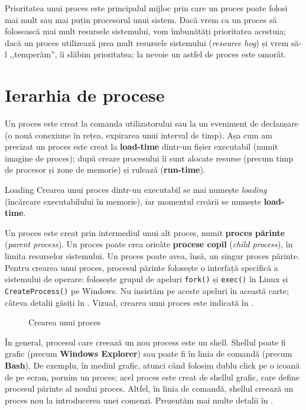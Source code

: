 Prioritatea unui proces este principalul mijloc prin care un proces poate folosi
mai mult sau mai puțin procesorul unui sistem. Dacă vrem ca un proces să
folosească mai mult resursele sistemului, vom îmbunătăți prioritatea acestuia;
dacă un proces utilizează prea mult resursele sistemului (\textit{resource hog}) și vrem să-l
,,temperăm'', îi slăbim prioritatea; la nevoie un astfel de proces este omorât.

\section{Ierarhia de procese}
\label{sec:process:hierarhy}

Un proces este creat la comanda utilizatorului sau la un eveniment de declanșare
(o nouă conexiune în rețea, expirarea unui interval de timp). Așa cum am precizat un proces este creat la \textbf{load-time}
dintr-un fișier executabil (numit imagine de proces); după creare
procesului îi sunt alocate resurse (precum timp de procesor și zone de memorie)
și rulează (\textbf{run-time}).

\begin{definition}{Loading}
Crearea unui proces dintr-un executabil se mai numește
\textit{loading} (încărcare executabilului în memorie), iar momentul creării se numește \textbf{load-time}.
\end{definition}

Un proces este creat prin intermediul unui alt proces, numit \textbf{proces părinte} (\textit{parent process}). Un
proces poate crea oricâte \textbf{procese copil} (\textit{child process}), în limita resurselor sistemului. Un
proces poate avea, însă, un singur proces părinte. Pentru crearea unui proces,
procesul părinte folosește o interfață specifică a sistemului de operare:
folosește grupul de apeluri \texttt{fork()} și \texttt{exec()} în Linux și \texttt{CreateProcess()} pe
Windows. Nu insistăm pe aceste apeluri în această carte; câteva detalii găsiți
în . Vizual,
crearea unui proces este indicată în .

\begin{figure}[!htbp]
	\centering
	\def\svgwidth{0.5\textwidth}
	
	\caption{Crearea unui proces}
	\label{fig:process:create}
\end{figure}

În general, procesul care creează un nou process este un shell. Shellul poate
fi grafic (precum \textbf{Windows Explorer}) sau poate fi în linia de comandă (precum
\textbf{Bash}). De exemplu, în mediul grafic, atunci când folosim dublu click pe o icoană
de pe ecran, pornim un proces; acel proces este creat de shellul grafic, care
define procesul părinte al noului proces. Altfel, în linia de comandă, shellul
creează un proces nou la introducerea unei comenzi. Prezentăm mai multe detalii
în .

